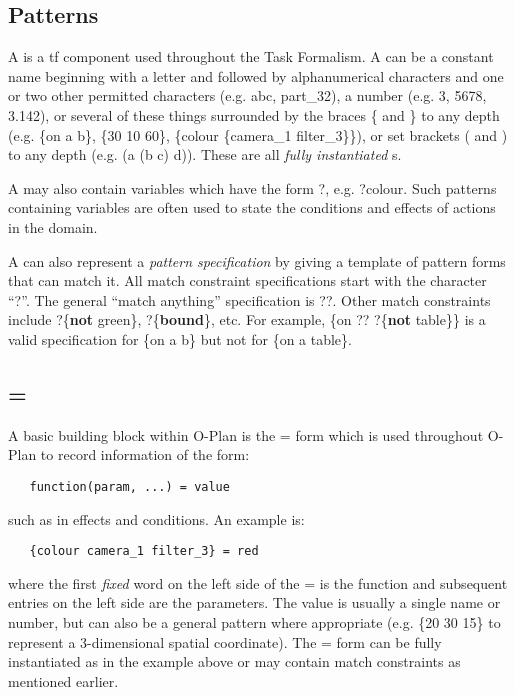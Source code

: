 \subsection{Patterns}

A  is a {\sc tf} component used throughout the Task Formalism.  A
 can be a constant name beginning with a letter and followed by
alphanumerical characters and one or two other permitted characters (e.g.
abc, part\_32), a number (e.g. 3, 5678, 3.142), or several of these
things surrounded by the braces \{ and \} to any depth (e.g. \{on a b\}, \{30
10 60\}, \{colour \{camera\_1 filter\_3\}\}), or set brackets ( and )
to any depth (e.g. (a (b c) d)).  These are all {\em fully
instantiated} s.

A  may also contain
variables which have the form ?, e.g. ?colour.  Such patterns
containing variables are often used to state the conditions and
effects of actions in the domain.

A  can also represent a {\em pattern specification} by giving a
template of pattern forms that can match it.  All match constraint
specifications start with the character ``?''.  The general ``match anything''
specification is ??.  Other match constraints include ?\{{\bf not}
green\}, ?\{{\bf bound}\}, etc.
For example, \{on ?? ?\{{\bf not} table\}\} is a valid specification for
\{on a b\} but not for \{on a table\}.

\subsection{ = }
 

A basic building block within O-Plan is the   = 
form which is used throughout O-Plan to record information of the form:

\begin{verbatim}
   function(param, ...) = value
\end{verbatim}
such as in effects and conditions.  An example is:
\begin{verbatim}
   {colour camera_1 filter_3} = red
\end{verbatim}
where the first {\em fixed} word on the left side of the = is the function and
subsequent entries on the left side are the parameters.  The value is usually
a single name or number, but can also be a general pattern where appropriate
(e.g. \{20 30 15\} to represent a 3-dimensional spatial coordinate).  The
 =  form can be fully instantiated as in the example
above or may contain match constraints as mentioned earlier.

